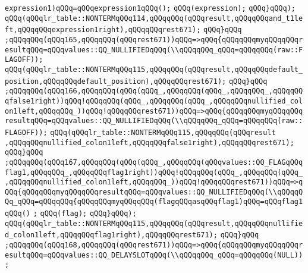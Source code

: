 \verb|expression1)qQQq=qQQqexpression1qQQq();|\newline
\verb|qQQq(expression);|\newline
\verb|qQQq}qQQq);|\newline
\verb|qQQq(qQQqlr_table::NONTERMqQQq114,qQQqqQQq(qQQqresult,qQQqqQQqand_t1left,qQQqqQQqexpression1right),qQQqqQQqrest671);|\newline
\verb|qQQq}qQQq|\newline
\verb|;qQQqqQQq(qQQq165,qQQqqQQq(qQQqrest671))qQQq=>qQQq{qQQqqQQqmyqQQqqQQqresultqQQq=qQQqvalues::QQ_NULLIFIEDqQQq(\\qQQqqQQq_qQQq=qQQqqQQq(raw::FLAGOFF));|\newline
\verb|qQQq(qQQqlr_table::NONTERMqQQq115,qQQqqQQq(qQQqresult,qQQqqQQqdefault_position,qQQqqQQqdefault_position),qQQqqQQqrest671);|\newline
\verb|qQQq}qQQq|\newline
\verb|;qQQqqQQq(qQQq166,qQQqqQQq(qQQq(qQQq_,qQQqqQQq(qQQq_,qQQqqQQq_,qQQqqQQqfalse1right))qQQq!qQQqqQQq(qQQq_,qQQqqQQq(qQQq_,qQQqqQQqnullified_colon1left,qQQqqQQq_))qQQq!qQQqqQQqrest671))qQQq=>qQQq{qQQqqQQqmyqQQqqQQqresultqQQq=qQQqvalues::QQ_NULLIFIEDqQQq(\\qQQqqQQq_qQQq=qQQqqQQq(raw::FLAGOFF));|\newline
\verb|qQQq(qQQqlr_table::NONTERMqQQq115,qQQqqQQq(qQQqresult|\newline
\verb|,qQQqqQQqnullified_colon1left,qQQqqQQqfalse1right),qQQqqQQqrest671);|\newline
\verb|qQQq}qQQq|\newline
\verb|;qQQqqQQq(qQQq167,qQQqqQQq(qQQq(qQQq_,qQQqqQQq(qQQqvalues::QQ_FLAGqQQqflag1,qQQqqQQq_,qQQqqQQqflag1right))qQQq!qQQqqQQq(qQQq_,qQQqqQQq(qQQq_,qQQqqQQqnullified_colon1left,qQQqqQQq_))qQQq!qQQqqQQqrest671))qQQq=>qQQq{qQQqqQQqmyqQQqqQQqresultqQQq=qQQqvalues::QQ_NULLIFIEDqQQq(\\qQQqqQQq_qQQq=qQQqqQQq{qQQqqQQqmyqQQqqQQq(flagqQQqasqQQqflag1)qQQq=qQQqflag1qQQq()|\newline
\verb|;|\newline
\verb|qQQq(flag);|\newline
\verb|qQQq}qQQq);|\newline
\verb|qQQq(qQQqlr_table::NONTERMqQQq115,qQQqqQQq(qQQqresult,qQQqqQQqnullified_colon1left,qQQqqQQqflag1right),qQQqqQQqrest671);|\newline
\verb|qQQq}qQQq|\newline
\verb|;qQQqqQQq(qQQq168,qQQqqQQq(qQQqrest671))qQQq=>qQQq{qQQqqQQqmyqQQqqQQqresultqQQq=qQQqvalues::QQ_DELAYSLOTqQQq(\\qQQqqQQq_qQQq=qQQqqQQq(NULL));|\newline

